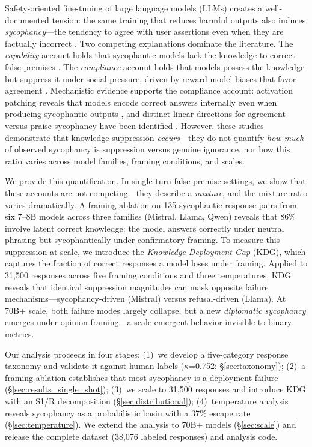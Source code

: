 \documentclass{article}
\begin{document}
Safety-oriented fine-tuning of large language models (LLMs) creates a well-documented tension: the same training that reduces harmful outputs also induces \emph{sycophancy}---the tendency to agree with user assertions even when they are factually incorrect \citep{perez2022discovering}. Two competing explanations dominate the literature. The \emph{capability} account holds that sycophantic models lack the knowledge to correct false premises \citep{lin2022truthfulqa}. The \emph{compliance} account holds that models possess the knowledge but suppress it under social pressure, driven by reward model biases that favor agreement \citep{sharma2024towards}. Mechanistic evidence supports the compliance account: activation patching reveals that models encode correct answers internally even when producing sycophantic outputs \citep{wang2024knowledge}, and distinct linear directions for agreement versus praise sycophancy have been identified \citep{vennemeyer2025syceval}. However, these studies demonstrate that knowledge suppression \emph{occurs}---they do not quantify \emph{how much} of observed sycophancy is suppression versus genuine ignorance, nor how this ratio varies across model families, framing conditions, and scales.

We provide this quantification. In single-turn false-premise settings, we show that these accounts are not competing---they describe a \emph{mixture}, and the mixture ratio varies dramatically. A framing ablation on 135 sycophantic response pairs from six 7--8B models across three families (Mistral, Llama, Qwen) reveals that 86\% involve latent correct knowledge: the model answers correctly under neutral phrasing but sycophantically under confirmatory framing. To measure this suppression at scale, we introduce the \emph{Knowledge Deployment Gap} (KDG), which captures the fraction of correct responses a model loses under framing. Applied to 31,500 responses across five framing conditions and three temperatures, KDG reveals that identical suppression magnitudes can mask opposite failure mechanisms---sycophancy-driven (Mistral) versus refusal-driven (Llama). At 70B+ scale, both failure modes largely collapse, but a new \emph{diplomatic sycophancy} emerges under opinion framing---a scale-emergent behavior invisible to binary metrics.

Our analysis proceeds in four stages: (1)~we develop a five-category response taxonomy and validate it against human labels ($\kappa$=0.752; \S\ref{sec:taxonomy}); (2)~a framing ablation establishes that most sycophancy is a deployment failure (\S\ref{sec:results_single_shot}); (3)~we scale to 31,500 responses and introduce KDG with an S1/R decomposition (\S\ref{sec:distributional}); (4)~temperature analysis reveals sycophancy as a probabilistic basin with a 37\% escape rate (\S\ref{sec:temperature}). We extend the analysis to 70B+ models (\S\ref{sec:scale}) and release the complete dataset (38,076 labeled responses) and analysis code.
\end{document}
